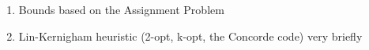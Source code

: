 \documentclass{mprop}
\theoremstyle{definition}
\begin{document}



\begin{enumerate}
\item Bounds based on the Assignment Problem
\item Lin-Kernigham heuristic (2-opt, k-opt, the Concorde code) very briefly
\end{enumerate}
\end{document}
